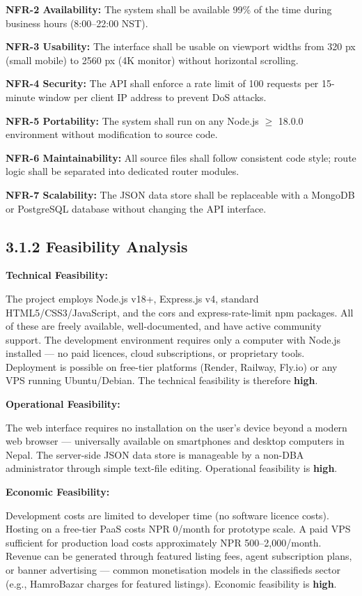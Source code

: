 \documentclass[12pt,a4paper]{report}
\begin{document}
\textbf{NFR-2 Availability:} The system shall be available 99\% of the time during business hours (8:00--22:00 NST).

\textbf{NFR-3 Usability:} The interface shall be usable on viewport widths from 320 px (small mobile) to 2560 px (4K monitor) without horizontal scrolling.

\textbf{NFR-4 Security:} The API shall enforce a rate limit of 100 requests per 15-minute window per client IP address to prevent DoS attacks.

\textbf{NFR-5 Portability:} The system shall run on any Node.js $\geq$ 18.0.0 environment without modification to source code.

\textbf{NFR-6 Maintainability:} All source files shall follow consistent code style; route logic shall be separated into dedicated router modules.

\textbf{NFR-7 Scalability:} The JSON data store shall be replaceable with a MongoDB or PostgreSQL database without changing the API interface.

\subsection{3.1.2 Feasibility Analysis}
\textbf{Technical Feasibility:}

The project employs Node.js v18+, Express.js v4, standard HTML5/CSS3/JavaScript, and the cors and express-rate-limit npm packages. All of these are freely available, well-documented, and have active community support. The development environment requires only a computer with Node.js installed --- no paid licences, cloud subscriptions, or proprietary tools. Deployment is possible on free-tier platforms (Render, Railway, Fly.io) or any VPS running Ubuntu/Debian. The technical feasibility is therefore \textbf{high}.

\textbf{Operational Feasibility:}

The web interface requires no installation on the user's device beyond a modern web browser --- universally available on smartphones and desktop computers in Nepal. The server-side JSON data store is manageable by a non-DBA administrator through simple text-file editing. Operational feasibility is \textbf{high}.

\textbf{Economic Feasibility:}

Development costs are limited to developer time (no software licence costs). Hosting on a free-tier PaaS costs NPR 0/month for prototype scale. A paid VPS sufficient for production load costs approximately NPR 500--2,000/month. Revenue can be generated through featured listing fees, agent subscription plans, or banner advertising --- common monetisation models in the classifieds sector (e.g., HamroBazar charges for featured listings). Economic feasibility is \textbf{high}.
\end{document}
